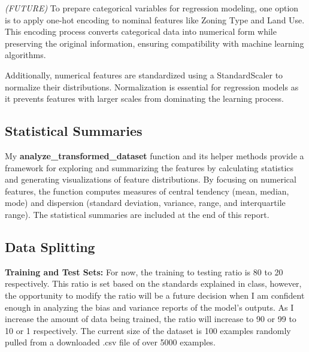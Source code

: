 \textit{(FUTURE)} To prepare categorical variables for regression modeling, one option is to apply one-hot encoding to nominal features like Zoning Type and Land Use. This encoding process converts categorical data into numerical form while preserving the original information, ensuring compatibility with machine learning algorithms. 

Additionally, numerical features are standardized using a StandardScaler to normalize their distributions. Normalization is essential for regression models as it prevents features with larger scales from dominating the learning process.

\subsection{Statistical Summaries}

My \textbf{analyze\_transformed\_dataset} function and its helper methods provide a framework for exploring and summarizing the features by calculating statistics and generating visualizations of feature distributions. By focusing on numerical features, the function computes measures of central tendency (mean, median, mode) and dispersion (standard deviation, variance, range, and interquartile range). The statistical summaries are included at the end of this report.

\subsection{Data Splitting}
\textbf{Training and Test Sets: } For now, the training to testing ratio is 80 to 20 respectively. This ratio is set based on the standards explained in class, however, the opportunity to modify the ratio will be a future decision when I am confident enough in analyzing the bias and variance reports of the model's outputs. As I increase the amount of data being trained, the ratio will increase to 90 or 99 to 10 or 1 respectively. The current size of the dataset is 100 examples randomly pulled from a downloaded .csv file of over 5000 examples.
